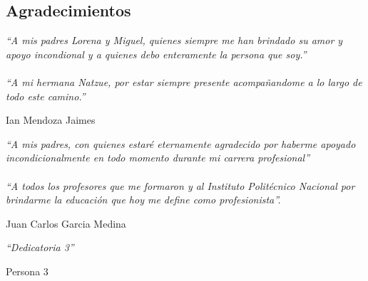 
\begin{comment}
\begin{acknowledgements}

También quisiera reconocer a ... por ...CONACYT,  PAPIIT / etc.
\end{acknowledgements}
\end{comment}

\begin{alwayssingle}
	{
		\pagestyle{empty}
		\vspace{1.5cm}
		{\chapter*{Agradecimientos}
			\noindent 
			\textit{``A mis padres Lorena y Miguel, quienes siempre me han brindado su amor y apoyo incondional y a quienes debo enteramente la persona que soy.''} \\
			\\
			\textit{``A mi hermana Natzue, por estar siempre presente acompañandome a lo largo de todo este camino.''}
			\begin{flushright}
				Ian Mendoza Jaimes
			\end{flushright}
			\noindent 
			\textit{``A mis padres, con quienes estaré eternamente agradecido por haberme apoyado incondicionalmente en todo momento durante mi carrera profesional'' }\\
			\\
			\textit{ ``A todos los profesores que me formaron y al Instituto Politécnico Nacional por brindarme la educación que hoy me define como profesionista''.}
			\begin{flushright}
				Juan Carlos Garcia Medina
			\end{flushright}
			\noindent 
			\textit{``Dedicatoria 3''}
			\begin{flushright}
				Persona 3
			\end{flushright}
			
		}
	}
	
\end{alwayssingle}




